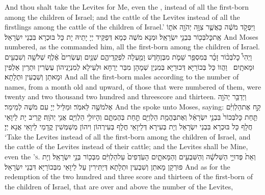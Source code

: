 {And thou shalt take the Levites for Me, even the \lord, instead of all the first-born among the children of Israel; and the cattle of the Levites instead of all the firstlings among the cattle of the children of Israel.’}{}
{וַיִּפְקֹ֣ד מֹשֶׁ֔ה כַּאֲשֶׁ֛ר צִוָּ֥ה יְהֹוָ֖ה אֹת֑וֹ אֶֽת\maqqaf כׇּל\maqqaf בְּכ֖וֹר בִּבְנֵ֥י יִשְׂרָאֵֽל׃}
{וּמְנָא מֹשֶׁה כְּמָא דְּפַקֵּיד יְיָ יָתֵיהּ יָת כָּל בּוּכְרָא בִּבְנֵי יִשְׂרָאֵל׃}
{And Moses numbered, as the \lord\space commanded him, all the first-born among the children of Israel.}{}
{וַיְהִי֩ כׇל\maqqaf בְּכ֨וֹר זָכָ֜ר בְּמִסְפַּ֥ר שֵׁמֹ֛ת מִבֶּן\maqqaf חֹ֥דֶשׁ וָמַ֖עְלָה לִפְקֻדֵיהֶ֑ם שְׁנַ֤יִם וְעֶשְׂרִים֙ אֶ֔לֶף שְׁלֹשָׁ֥ה וְשִׁבְעִ֖ים וּמָאתָֽיִם׃ \petucha }
{וַהֲווֹ כָּל בְּכוֹרַיָּא דְּכוּרַיָּא בְּמִנְיַן שְׁמָהָן מִבַּר יַרְחָא וּלְעֵילָא לְמִנְיָנֵיהוֹן עֶשְׂרִין וּתְרֵין אַלְפִין וּמָאתַן וְשִׁבְעִין וּתְלָתָא׃}
{And all the first-born males according to the number of names, from a month old and upward, of those that were numbered of them, were twenty and two thousand two hundred and threescore and thirteen.}{}
{וַיְדַבֵּ֥ר יְהֹוָ֖ה אֶל\maqqaf מֹשֶׁ֥ה לֵּאמֹֽר׃}
{וּמַלֵּיל יְיָ עִם מֹשֶׁה לְמֵימַר׃}
{And the \lord\space spoke unto Moses, saying:}{}
{קַ֣ח אֶת\maqqaf הַלְוִיִּ֗ם תַּ֤חַת כׇּל\maqqaf בְּכוֹר֙ בִּבְנֵ֣י יִשְׂרָאֵ֔ל וְאֶת\maqqaf בֶּהֱמַ֥ת הַלְוִיִּ֖ם תַּ֣חַת בְּהֶמְתָּ֑ם וְהָיוּ\maqqaf לִ֥י הַלְוִיִּ֖ם אֲנִ֥י יְהֹוָֽה׃}
{קָרֵיב יָת לֵיוָאֵי חֲלָף כָּל בּוּכְרָא בִּבְנֵי יִשְׂרָאֵל וְיָת בְּעִירָא דְּלֵיוָאֵי חֲלָף בְּעִירְהוֹן וִיהוֹן מְשַׁמְּשִׁין קֳדָמַי לֵיוָאֵי אֲנָא יְיָ׃}
{‘Take the Levites instead of all the first-born among the children of Israel, and the cattle of the Levites instead of their cattle; and the Levites shall be Mine, even the \lord\textsc{’s}.}{}
{וְאֵת֙ פְּדוּיֵ֣י הַשְּׁלֹשָׁ֔ה וְהַשִּׁבְעִ֖ים וְהַמָּאתָ֑יִם הָעֹֽדְפִים֙ עַל\maqqaf הַלְוִיִּ֔ם מִבְּכ֖וֹר בְּנֵ֥י יִשְׂרָאֵֽל׃}
{וְיָת פּוּרְקַן מָאתַן וְשִׁבְעִין וּתְלָתָא דְּיַתִּירִין עַל לֵיוָאֵי מִבְּכוֹרַיָּא דִּבְנֵי יִשְׂרָאֵל׃}
{And as for the redemption of the two hundred and three score and thirteen of the first-born of the children of Israel, that are over and above the number of the Levites,}{}
